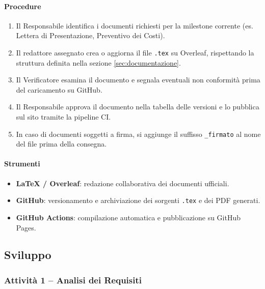 \documentclass[a4paper, 11pt, oneside]{scrartcl}
\begin{document}
\paragraph{Procedure}
\begin{enumerate}
    \item Il Responsabile identifica i documenti richiesti per la milestone{\scriptsize{}} corrente (es. Lettera di Presentazione, Preventivo dei Costi).
    \item Il redattore assegnato crea o aggiorna il file \texttt{.tex} su Overleaf, rispettando la struttura definita nella sezione \ref{sec:documentazione}.
    \item Il Verificatore esamina il documento e segnala eventuali non conformità prima del caricamento su GitHub.
    \item Il Responsabile approva il documento nella tabella delle versioni e lo pubblica sul sito tramite la pipeline CI{\scriptsize{}}.
    \item In caso di documenti soggetti a firma, si aggiunge il suffisso \texttt{\_firmato} al nome del file prima della consegna.
\end{enumerate}

\paragraph{Strumenti}
\begin{itemize}
    \item \textbf{\LaTeX{} / Overleaf}: redazione collaborativa dei documenti ufficiali.
    \item \textbf{GitHub}: versionamento e archiviazione dei sorgenti \texttt{.tex} e dei PDF generati.
    \item \textbf{GitHub Actions}: compilazione automatica e pubblicazione su GitHub Pages.
\end{itemize}

\subsection{Sviluppo}

\subsubsection{Attività 1 – Analisi dei Requisiti{\scriptsize{}}}
\end{document}

